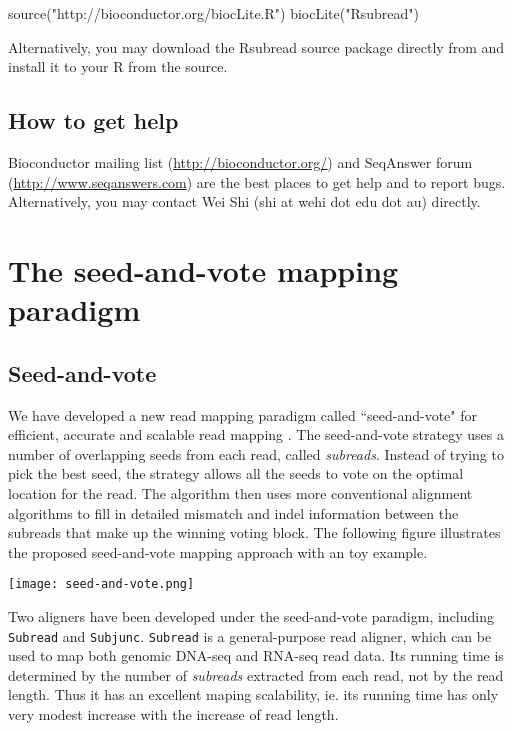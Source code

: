 \documentclass[12pt]{report}
\newcommand{\code}[1]{{\small\texttt{#1}}}
\newcommand{\Rsubread}{\textsf{Rsubread}}
\newcommand{\R}{\textsf{R}}
\begin{document}
\begin{Rcode}
source("http://bioconductor.org/biocLite.R")
biocLite("Rsubread")
\end{Rcode}

Alternatively, you may download the {\Rsubread} source package directly from { } and install it to your {\R} from the source.


\section{How to get help}

Bioconductor mailing list (\url{http://bioconductor.org/}) and SeqAnswer forum (\url{http://www.seqanswers.com}) are the best places to get help and to report bugs.
Alternatively, you may contact Wei Shi (shi at wehi dot edu dot au) directly.

\chapter{The seed-and-vote mapping paradigm}

\section{Seed-and-vote}

We have developed a new read mapping paradigm called ``seed-and-vote" for efficient, accurate and scalable read mapping \cite{liao}.
The seed-and-vote strategy uses a number of overlapping seeds from each read, called \emph{subreads}.
Instead of trying to pick the best seed, the strategy allows all the seeds to vote on the optimal location for the read.
The algorithm then uses more conventional alignment algorithms to fill in detailed mismatch and indel information between the subreads that make up the winning voting block. 
The following figure illustrates the proposed seed-and-vote mapping approach with an toy example.

\begin{center}
\texttt{[image: seed-and-vote.png]}
\end{center}

Two aligners have been developed under the seed-and-vote paradigm, including \code{Subread} and \code{Subjunc}.
\code{Subread} is a general-purpose read aligner, which can be used to map both genomic DNA-seq and RNA-seq read data.
Its running time is determined by the number of \emph{subreads} extracted from each read, not by the read length.
Thus it has an excellent maping scalability, ie. its running time has only very modest increase with the increase of read length.
\end{document}
